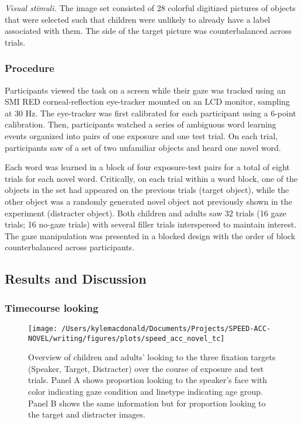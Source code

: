 \documentclass[man,floatsintext]{apa6}
\begin{document}
\emph{Visual stimuli.} The image set consisted of 28 colorful digitized
pictures of objects that were selected such that children were unlikely
to already have a label associated with them. The side of the target
picture was counterbalanced across trials.

\subsubsection{Procedure}\label{procedure-2}

Participants viewed the task on a screen while their gaze was tracked
using an SMI RED corneal-reflection eye-tracker mounted on an LCD
monitor, sampling at 30 Hz. The eye-tracker was first calibrated for
each participant using a 6-point calibration. Then, participants watched
a series of ambiguous word learning events organized into pairs of one
exposure and one test trial. On each trial, participants saw of a set of
two unfamiliar objects and heard one novel word.

Each word was learned in a block of four exposure-test pairs for a total
of eight trials for each novel word. Critically, on each trial within a
word block, one of the objects in the set had appeared on the previous
trials (target object), while the other object was a randomly generated
novel object not previously shown in the experiment (distracter object).
Both children and adults saw 32 trials (16 gaze trials; 16 no-gaze
trials) with several filler trials interspersed to maintain interest.
The gaze manipulation was presented in a blocked design with the order
of block counterbalanced across participants.

\subsection{Results and Discussion}\label{results-and-discussion-2}

\subsubsection{Timecourse looking}\label{timecourse-looking}

\begin{figure}[!t]

{\centering \texttt{[image: /Users/kylemacdonald/Documents/Projects/SPEED-ACC-NOVEL/writing/figures/plots/speed\_acc\_novel\_tc]} 

}

\caption{Overview of children and adults' looking to the three fixation targets (Speaker, Target, Distracter) over the course of exposure and test trials. Panel A shows proportion looking to the speaker's face with color indicating gaze condition and linetype indicating age group. Panel B shows the same information but for proportion looking to the target and distracter images.}\label{fig:san-tc-plot}
\end{figure}
\end{document}

